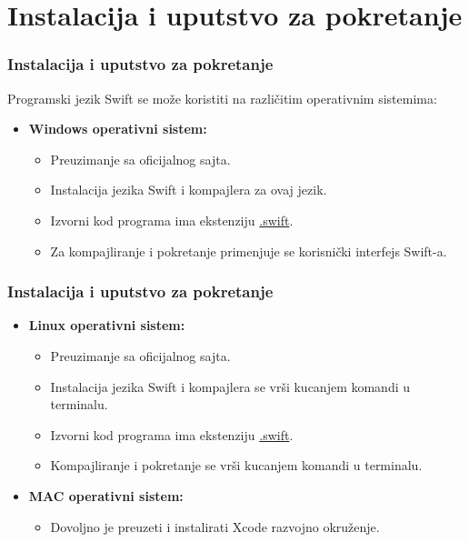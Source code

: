 \documentclass{beamer}
\begin{document}
\section{Instalacija i uputstvo za pokretanje}
\begin{frame}
\frametitle{Instalacija i uputstvo za pokretanje}

Programski jezik Swift se može koristiti na različitim operativnim sistemima:\\

\begin{itemize}

\item{\textbf{Windows operativni sistem:}}
\begin{itemize}
\item{Preuzimanje sa oficijalnog sajta}.
\item{Instalacija jezika Swift i kompajlera za ovaj jezik.}
\item{Izvorni kod programa ima ekstenziju \underline{.swift}}.
\item{Za kompajliranje i pokretanje primenjuje se korisnički interfejs Swift-a.}
\end{itemize}
\end{itemize}

\end{frame}

\begin{frame}
\frametitle{Instalacija i uputstvo za pokretanje}

\begin{itemize}

\item{\textbf{Linux operativni sistem:}}
\begin{itemize}
\item{Preuzimanje sa oficijalnog sajta}.
\item{Instalacija jezika Swift i kompajlera se vrši kucanjem komandi u terminalu.}
\item{Izvorni kod programa ima ekstenziju \underline{.swift}}.
\item{Kompajliranje i pokretanje se vrši kucanjem komandi u terminalu.}
\end{itemize}
		  
\item{\textbf{MAC operativni sistem:}}
\begin{itemize}
\item{Dovoljno je preuzeti i instalirati Xcode razvojno okruženje.}
\end{itemize}
\end{itemize}

\end{frame}
\end{document}
